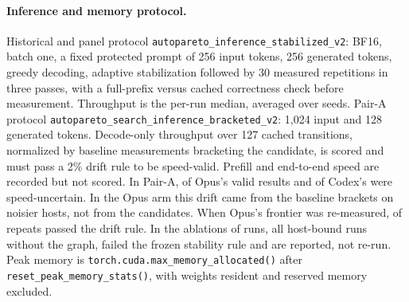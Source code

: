 \documentclass{article}
\begin{document}
\begin{table}[H]
\caption{Recorded software environment by era. Panel, Pair-A, E1 and Opus-test rows are read from their run records. Other rows are from the provenance audit.}\label{tab:env}
\centering\scriptsize
\end{table}

\paragraph{Inference and memory protocol.} Historical and panel protocol \texttt{autopareto\_inference\_stabilized\_v2}: BF16, batch one, a fixed protected prompt of 256 input tokens, 256 generated tokens, greedy decoding, adaptive stabilization followed by 30 measured repetitions in three passes, with a full-prefix versus cached correctness check before measurement. Throughput is the per-run median, averaged over seeds. Pair-A protocol \texttt{autopareto\_search\_inference\_bracketed\_v2}: 1,024 input and 128 generated tokens. Decode-only throughput over 127 cached transitions, normalized by baseline measurements bracketing the candidate, is scored and must pass a 2\% drift rule to be speed-valid. Prefill and end-to-end speed are recorded but not scored. In Pair-A, \CROpUncertain{} of Opus's \CROpValid{} valid results and \CRCxUncertain{} of Codex's \CRCxValid{} were speed-uncertain. In the Opus arm this drift came from the baseline brackets on noisier hosts, not from the candidates. When Opus's frontier was re-measured, \CROpStableRepeats{} of \CROpRepeats{} repeats passed the drift rule. In the ablations \CRIAUnstable{} of \CRIARuns{} runs, all host-bound runs without the graph, failed the frozen stability rule and are reported, not re-run. Peak memory is \texttt{torch.cuda.max\_memory\_allocated()} after \texttt{reset\_peak\_memory\_stats()}, with weights resident and reserved memory excluded.
\end{document}
